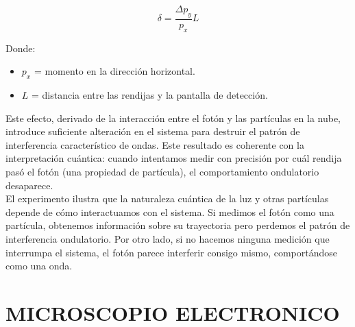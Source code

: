 \documentclass[a4paper]{article}
\begin{document}
    \begin{equation}
        \delta = \frac{\Delta p_y}{p_x} L
    \end{equation}

    \indent Donde: \\

      \begin{itemize} [itemsep = -1.5em, topsep = 0em, leftmargin = 1cm]
        \item $p_x$ = momento en la dirección horizontal. \\
        \item $L$ = distancia entre las rendijas y la pantalla de detección. \\
      \end{itemize}

    \indent Este efecto, derivado de la interacción entre el fotón y las partículas en la nube, introduce suficiente alteración en el sistema para destruir el patrón de interferencia característico de ondas. Este resultado es coherente con la interpretación cuántica: cuando intentamos medir con precisión por cuál rendija pasó el fotón (una propiedad de partícula), el comportamiento ondulatorio desaparece.\\

    \indent El experimento ilustra que la naturaleza cuántica de la luz y otras partículas depende de cómo interactuamos con el sistema. Si medimos el fotón como una partícula, obtenemos información sobre su trayectoria pero perdemos el patrón de interferencia ondulatorio. Por otro lado, si no hacemos ninguna medición que interrumpa el sistema, el fotón parece interferir consigo mismo, comportándose como una onda.


\section{MICROSCOPIO ELECTRONICO}
\end{document}
